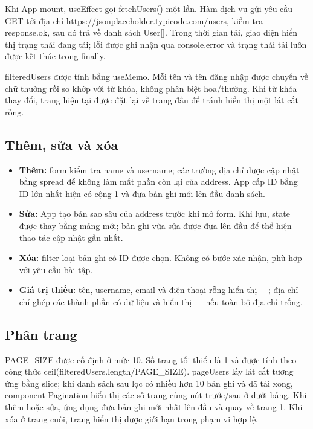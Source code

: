 \documentclass[12pt,a4paper]{article}
\newcommand{\code}[1]{\textsf{\small #1}}
\begin{document}
Khi \code{App} mount, \code{useEffect} gọi \code{fetchUsers()} một lần. Hàm dịch vụ gửi yêu cầu GET tới địa chỉ \url{https://jsonplaceholder.typicode.com/users}, kiểm tra \code{response.ok}, sau đó trả về danh sách \code{User[]}. Trong thời gian tải, giao diện hiển thị trạng thái đang tải; lỗi được ghi nhận qua \code{console.error} và trạng thái tải luôn được kết thúc trong \code{finally}.

\code{filteredUsers} được tính bằng \code{useMemo}. Mỗi tên và tên đăng nhập được chuyển về chữ thường rồi so khớp với từ khóa, không phân biệt hoa/thường. Khi từ khóa thay đổi, trang hiện tại được đặt lại về trang đầu để tránh hiển thị một lát cắt rỗng.

\subsection{Thêm, sửa và xóa}

\begin{itemize}
  \item \textbf{Thêm:} form kiểm tra \code{name} và \code{username}; các trường địa chỉ được cập nhật bằng spread để không làm mất phần còn lại của \code{address}. \code{App} cấp ID bằng ID lớn nhất hiện có cộng 1 và đưa bản ghi mới lên đầu danh sách.
  \item \textbf{Sửa:} \code{App} tạo bản sao sâu của \code{address} trước khi mở form. Khi lưu, state được thay bằng mảng mới; bản ghi vừa sửa được đưa lên đầu để thể hiện thao tác cập nhật gần nhất.
  \item \textbf{Xóa:} \code{filter} loại bản ghi có ID được chọn. Không có bước xác nhận, phù hợp với yêu cầu bài tập.
  \item \textbf{Giá trị thiếu:} tên, username, email và điện thoại rỗng hiển thị \code{—}; địa chỉ chỉ ghép các thành phần có dữ liệu và hiển thị \code{—} nếu toàn bộ địa chỉ trống.
\end{itemize}

\subsection{Phân trang}

\code{PAGE\_SIZE} được cố định ở mức 10. Số trang tối thiểu là 1 và được tính theo công thức \code{ceil(filteredUsers.length\allowbreak /\allowbreak PAGE\_SIZE)}. \code{pageUsers} lấy lát cắt tương ứng bằng \code{slice}; khi danh sách sau lọc có nhiều hơn 10 bản ghi và đã tải xong, component \code{Pagination} hiển thị các số trang cùng nút trước/sau ở dưới bảng. Khi thêm hoặc sửa, ứng dụng đưa bản ghi mới nhất lên đầu và quay về trang 1. Khi xóa ở trang cuối, trang hiển thị được giới hạn trong phạm vi hợp lệ.
\end{document}
